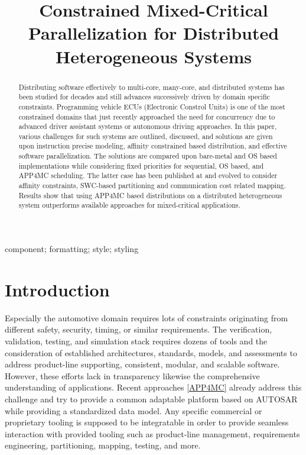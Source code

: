 \documentclass [a4paper,final,conference,10pt]{IDAACS}
\title{Constrained Mixed-Critical Parallelization for Distributed Heterogeneous Systems}
\author{
\IEEEauthorblockN{Robert Höttger\IEEEauthorrefmark{1}, Mustafa Özcelikörs\IEEEauthorrefmark{1}}

\IEEEauthorblockA{\IEEEauthorrefmark{1}Dortmund University of Applied Sciences and Arts - IDiAL Institute, \\\{robert.hoettger, mustafa.ozcelikors\}@fh-dortmund.de, www.idial.org\\
	}
}
\begin{document}
\maketitle

\let\thefootnote\relax{}

\begin{abstract}
Distributing software effectively to multi-core, many-core, and distributed systems has been studied for decades and still advances successively driven by domain specific constraints. Programming vehicle ECUs (Electronic Constrol Units) is one of the most constrained domains that just recently approached the need for concurrency due to advanced driver assistant systems or autonomous driving approaches. In this paper, various challenges for such systems are outlined, discussed, and solutions are given upon instruction precise modeling, affinity constrained based distribution, and effective software parallelization. The solutions are compared upon bare-metal and OS based implementations while considering fixed priorities for sequential, OS based, and APP4MC scheduling. The latter case has been published at \cite{ICPDSSE} and evolved to consider affinity constraints, SWC-based partitioning and communication cost related mapping. Results show that using APP4MC based distributions on a distributed heterogeneous system outperforms available approaches for mixed-critical applications. %

\end{abstract}

\begin{IEEEkeywords}
component; formatting; style; styling
\end{IEEEkeywords}

\section{Introduction}

Especially the automotive domain requires lots of constraints originating from different safety, security, timing, or similar requirements. The verification, validation, testing, and simulation stack requires dozens of tools and the consideration of established architectures, standards, models, and assessments to address product-line supporting, consistent, modular, and scalable software. However, these efforts lack in transparency likewise the comprehensive understanding of applications. Recent approaches \ref{APP4MC} already address this challenge and try to provide a common adaptable platform based on AUTOSAR while providing a standardized data model. Any specific commercial or proprietary tooling is supposed to be integratable in order to provide seamless interaction with provided tooling such as product-line management, requirements engineering, partitioning, mapping, testing, and more. 
\end{document}
